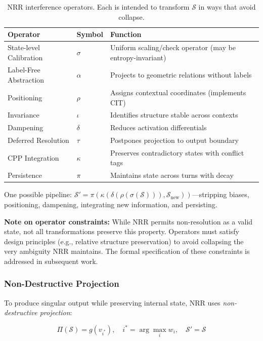 \documentclass[11pt,a4paper]{article}
\begin{document}
\begin{table}[h]
\centering
\small
\begin{tabular}{lll}
\toprule
\textbf{Operator} & \textbf{Symbol} & \textbf{Function} \\
\midrule
State-level Calibration & $\sigma$ & Uniform scaling/check operator (may be entropy-invariant) \\
Label-Free Abstraction & $\alpha$ & Projects to geometric relations without labels \\
Positioning & $\rho$ & Assigns contextual coordinates (implements CIT) \\
Invariance & $\iota$ & Identifies structure stable across contexts \\
Dampening & $\delta$ & Reduces activation differentials \\
Deferred Resolution & $\tau$ & Postpones projection to output boundary \\
CPP Integration & $\kappa$ & Preserves contradictory states with conflict tags \\
Persistence & $\pi$ & Maintains state across turns with decay \\
\bottomrule
\end{tabular}
\caption{NRR interference operators. Each is intended to transform $\mathcal{S}$ in ways that avoid collapse.}
\label{tab:operators}
\end{table}

One possible pipeline: $\mathcal{S}' = \pi(\kappa(\delta(\rho(\sigma(\mathcal{S}))), \mathcal{S}_{\text{new}}))$---stripping biases, positioning, dampening, integrating new information, and persisting.

\textbf{Note on operator constraints:} While NRR permits non-resolution as a valid state, not all transformations preserve this property. Operators must satisfy design principles (e.g., relative structure preservation) to avoid collapsing the very ambiguity NRR maintains. The formal specification of these constraints is addressed in subsequent work.

\subsubsection{Non-Destructive Projection}

To produce singular output while preserving internal state, NRR uses \textit{non-destructive projection}:

\begin{equation}
\Pi(\mathcal{S}) = g(v_{i^*}), \quad i^* = \arg\max_i w_i, \quad \mathcal{S}' = \mathcal{S}
\end{equation}
\end{document}

